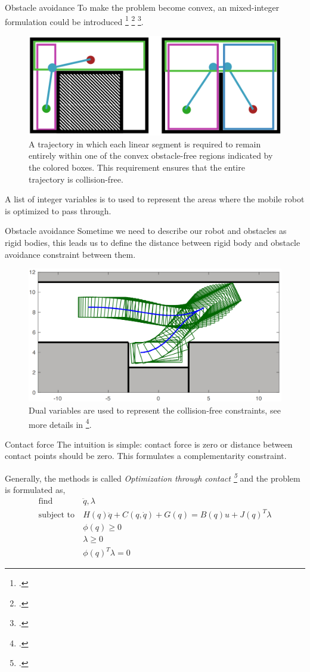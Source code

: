 \documentclass{beamer}
\begin{document}
\begin{frame}{Obstacle avoidance}
	To make the problem become convex, an mixed-integer formulation could be introduced \footcite{richards2002aircraft} \footcite{deits2014footstep} \footcite{deits2015efficient}.
	\begin{figure}
		\includegraphics[width=0.5\linewidth]{figures/collision-free-mixed-integer.png}
		\caption{A trajectory in which each linear segment is required to remain entirely within one of the convex obstacle-free regions indicated by the colored boxes. This requirement ensures that the entire trajectory is collision-free.}
	\end{figure}
	A list of integer variables is to used to represent the areas where the mobile robot is optimized to pass through. 
\end{frame}

\begin{frame}{Obstacle avoidance}
	Sometime we need to describe our robot and obstacles as rigid bodies, this leads us to define the distance between rigid body and obstacle avoidance constraint between them.
	\begin{figure}
		\includegraphics[width=0.5\linewidth]{figures/parallel-parking.png}
		\caption{Dual variables are used to represent the collision-free constraints, see more details in \footcite{zhang2017optimization}.}
	\end{figure}
\end{frame}

\begin{frame}{Contact force}
	The intuition is simple: contact force is zero or distance between contact points should be zero. This formulates a complementarity constraint.
	
	\vspace{\baselineskip}
	Generally, the methods is called \emph{Optimization through contact \footcite{posa2014direct}} and the problem is formulated as,
	\begin{align*}
		\text{find} \ & \ddot{q}, \lambda \\
		\text{subject to} \ & H(q) \ddot{q} + C(q, \dot{q}) + G(q) = B(q) u + J(q)^T \lambda \\
		& \phi(q) \geq 0 \\
		& \lambda \geq 0 \\
		& \phi(q)^T \lambda  = 0
	\end{align*}
\end{frame}
\end{document}
